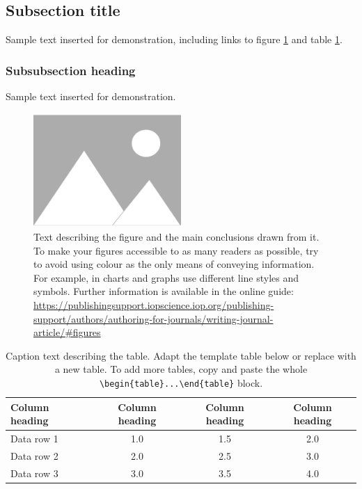 \documentclass{iopjournal}
\begin{document}
\subsection{Subsection title}
Sample text inserted for demonstration, including links to figure \ref{fig1} and table \ref{tab1}.

\subsubsection{Subsubsection heading}
Sample text inserted for demonstration.

\begin{figure}
 \centering
        \includegraphics[width=0.5\textwidth]{figure1}
 \caption{Text describing the figure and the main conclusions drawn from it. To make your figures accessible to as many readers as possible, try to avoid using colour as the only means of conveying information. For example, in charts and graphs use different line styles and symbols. Further information is available in the online guide: \href{https://publishingsupport.iopscience.iop.org/publishing-support/authors/authoring-for-journals/writing-journal-article/\#figures}{https://publishingsupport.iopscience.iop.org/publishing-support/authors/authoring-for-journals/writing-journal-article/\#figures}}
\label{fig1}
\end{figure}


\begin{table}
\caption{Caption text describing the table. Adapt the template table below or replace with a new table. To add more tables, copy and paste the whole {\tt \textbackslash begin\{table\}...\textbackslash end\{table\}} block.}
\centering
\begin{tabular}{l c c c}
\hline
Column heading & Column heading & Column heading & Column heading \\
\hline
Data row 1 & 1.0 & 1.5 & 2.0 \\
Data row 2 & 2.0 & 2.5 & 3.0 \\
Data row 3 & 3.0 & 3.5 & 4.0 \\
\hline
\end{tabular}
\label{tab1}
\end{table}
\end{document}
